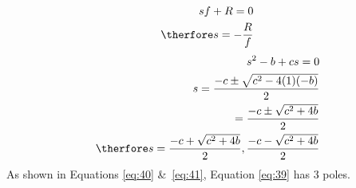 \begin{align}
    sf+R = 0 \nonumber \\
    \therfore s = -\frac{R}{f} \label{eq:40}
\end{align}
\begin{align}
    s^2 - b + cs = 0 \nonumber \\
    s = \frac{-c \pm \sqrt{c^2 - 4(1)(-b)}}{2} \nonumber \\
    = \frac{-c \pm \sqrt{c^2 + 4b}}{2} \nonumber \\
    \therfore s = \frac{-c + \sqrt{c^2 + 4b}}{2} ,\frac{-c - \sqrt{c^2 + 4b}}{2} \label{eq:41}   
\end{align}
As shown in Equations \eqref{eq:40} \&\ \eqref{eq:41}, Equation \eqref{eq:39} has 3 poles.